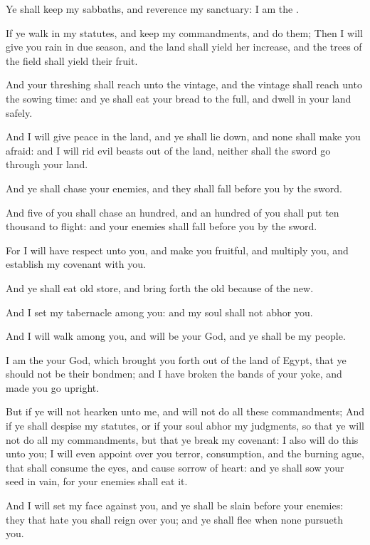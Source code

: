 \Verse Ye shall keep my sabbaths, and reverence my sanctuary: I am the \LORD.

\Verse If ye walk in my statutes, and keep my commandments, and do them; \Verse Then I will give you rain in due season, and the land shall yield her increase, and the trees of the field shall yield their fruit.

\Verse And your threshing shall reach unto the vintage, and the vintage shall reach unto the sowing time: and ye shall eat your bread to the full, and dwell in your land safely.

\Verse And I will give peace in the land, and ye shall lie down, and none shall make you afraid: and I will rid evil beasts out of the land, neither shall the sword go through your land.

\Verse And ye shall chase your enemies, and they shall fall before you by the sword.

\Verse And five of you shall chase an hundred, and an hundred of you shall put ten thousand to flight: and your enemies shall fall before you by the sword.

\Verse For I will have respect unto you, and make you fruitful, and multiply you, and establish my covenant with you.

\Verse And ye shall eat old store, and bring forth the old because of the new.

\Verse And I set my tabernacle among you: and my soul shall not abhor you.

\Verse And I will walk among you, and will be your God, and ye shall be my people.

\Verse I am the \LORD your God, which brought you forth out of the land of Egypt, that ye should not be their bondmen; and I have broken the bands of your yoke, and made you go upright.

\Verse But if ye will not hearken unto me, and will not do all these commandments; \Verse And if ye shall despise my statutes, or if your soul abhor my judgments, so that ye will not do all my commandments, but that ye break my covenant: \Verse I also will do this unto you; I will even appoint over you terror, consumption, and the burning ague, that shall consume the eyes, and cause sorrow of heart: and ye shall sow your seed in vain, for your enemies shall eat it.

\Verse And I will set my face against you, and ye shall be slain before your enemies: they that hate you shall reign over you; and ye shall flee when none pursueth you.

